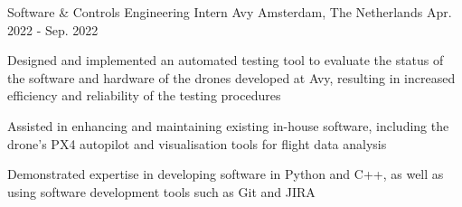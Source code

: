   \cventry
    {Software \& Controls Engineering Intern} %
    {Avy} %
    {Amsterdam, The Netherlands} %
    {Apr. 2022 - Sep. 2022} %
    {
      \begin{cvitems} %
        \item {Designed and implemented an automated testing tool to evaluate the status of the software and hardware of the drones developed at Avy, resulting in increased efficiency and reliability of the testing procedures}
        \item {Assisted in enhancing and maintaining existing in-house software, including the drone's PX4 autopilot and visualisation tools for flight data analysis}
        \item {Demonstrated expertise in developing software in Python and C++, as well as using software development tools such as Git and JIRA}
      \end{cvitems}
    }


